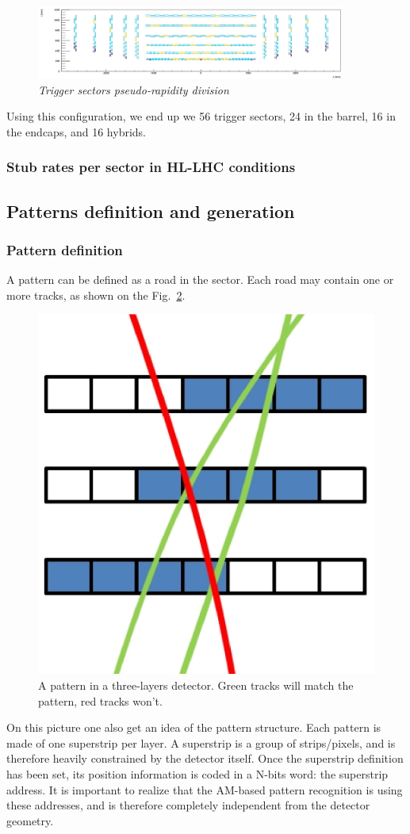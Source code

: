 \begin{figure}[ht!]
\centering
\includegraphics[width=0.9\textwidth]{Plots/EtaCut.eps}
\caption{\emph{Trigger sectors pseudo-rapidity division}}
\label{fig:SEC_ETA}
\end{figure} 

\noindent Using this configuration, we end up we 56 trigger sectors, 24 in the barrel, 16 in the endcaps, and 16 hybrids.

\subsubsection{Stub rates per sector in HL-LHC conditions}





\subsection{Patterns definition and generation}

\subsubsection{Pattern definition}

\noindent A pattern can be defined as a road in the sector. Each road may contain one or more tracks, as shown on the Fig.~\ref{fig:pattern}. 
\begin{figure}[ht!]
\centering
\includegraphics[width=0.3\columnwidth]{Plots/Pattern.eps}
\caption{A pattern in a three-layers detector. Green tracks will match the pattern, red tracks won't.}
\label{fig:pattern}
\end{figure}

\noindent On this picture one also get an idea of the pattern structure. Each pattern is made of one superstrip per layer. A superstrip is a group of strips/pixels, and is therefore heavily constrained by the detector itself. Once the superstrip definition has been set, its position information is coded in a N-bits word: the superstrip address. It is important to realize that the AM-based pattern recognition is using these addresses, and is therefore completely independent from the detector geometry.

